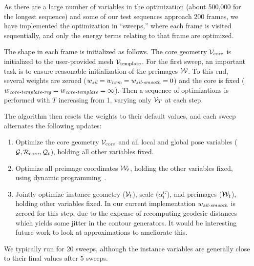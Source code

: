 \documentclass[preprint]{acmsiggraph}
\begin{document}
As there are a large number of variables in the optimization (about 500,000 for the longest sequence)
and some of our test sequences approach 200 frames, we have implemented the optimization in ``sweeps,'' where each frame is visited sequentially, and only the energy terms relating to that frame are optimized.  

The shape in each frame is initialized as follows. The core geometry $\mathcal{V}_{\text{core}}$ is initialized to the user-provided mesh $\mathcal{V}_{\text{template}}$.  For the first sweep, an important task is to ensure reasonable initialization of the preimages $\mathcal{W}$.  To this end, 
several weights are zeroed ($w_{\text{\em sil}} = w_{\text{\em nrm}} = w_{\text{\em sil-smooth}} = 0$) and the core is fixed ($w_{\text{\em core-template-reg}} = w_{\text{\em core-template}} = \infty$).  Then a sequence of optimizations is performed with $T$ increasing from 1, varying only $\mathcal{V}_T$ at each step.

The algorithm then resets the weights to their default values, and each sweep alternates the following updates:
\begin{enumerate}
\item Optimize the core geometry $\mathcal{V}_{\text{core}}$ and all local and global pose variables ($\mathcal{G}, \mathcal{R}_{\text{core}}, \mathcal{Q}_t$), holding all other variables fixed.
\item Optimize all preimage coordinates $\mathcal{W}_t$, holding the other variables fixed, using dynamic programming~\cite{Cashman:2012:WSA}.
\item Jointly optimize instance geometry ($\mathcal{V}_t$), scale ($\alpha^G_t$), and preimages ($\mathcal{W}_t$), holding other variables fixed. 
In our current implementation $w_{\text{\em sil-smooth}}$ is zeroed for this step, due to the expense of recomputing geodesic distances which yields some jitter in the contour generators.   It would be interesting future work to look at approximations to ameliorate this.
\end{enumerate}
We typically run for 20 sweeps, although the instance variables are generally close to their final values after 5 sweeps.

\end{document}
